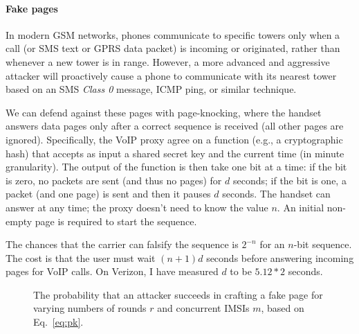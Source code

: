 \paragraph*{Fake pages}
In modern GSM networks, phones communicate to specific towers only
when a call (or SMS text or GPRS data packet) is incoming or
originated, rather than whenever a new tower is in
range\cite{Razavi:2011,Wong:2000}. However, a more advanced and
aggressive attacker will proactively cause a phone to communicate with
its nearest tower~\cite{Ficek:2013a} based on an SMS {\em Class 0}
message, ICMP ping, or similar technique.

We can defend against these pages with page-knocking, where the handset answers data pages only after a correct sequence is received (all other pages are ignored). Specifically, the VoIP proxy agree on a  function (e.g., a cryptographic hash) that accepts as input a shared secret key and the current time (in minute granularity). The output of the function is then take one bit at a time: if the bit is zero, no packets are sent (and thus no pages) for $d$ seconds; if the bit is one, a packet (and one page) is sent and then it pauses $d$ seconds. The handset can answer at any time; the proxy doesn't need to know the value $n$. An initial non-empty page is required to start the sequence.

The chances that the carrier can falsify the sequence is $2^{-n}$ for an $n$-bit sequence. The cost is that the user must wait $(n+1)d$ seconds before answering incoming pages for VoIP calls. On Verizon, I have measured $d$ to be $5.12 * 2$ seconds. 

 \begin{figure}[t] 
	\caption{The probability that an attacker succeeds in crafting a fake page for varying  numbers of rounds $r$ and concurrent IMSIs $m$, based on Eq.~\ref{eq:pk}.}
	\label{fig:pk}
\end{figure}

